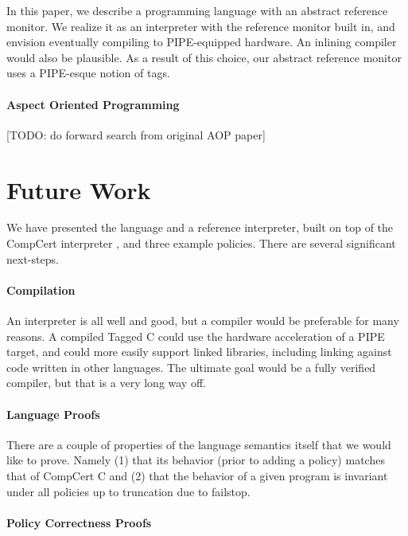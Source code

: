 \documentclass{llncs}
\begin{document}
{In this paper, we describe a programming language with an abstract reference monitor.
We realize it as an interpreter with the reference monitor built in, and envision
eventually compiling to PIPE-equipped hardware. An inlining compiler would also be plausible.
As a result of this choice, our abstract reference monitor uses a PIPE-esque notion of
tags.

\paragraph{Aspect Oriented Programming}

[TODO: do forward search from original AOP paper]

\section{Future Work}
\label{sec:futurework}

We have presented the language and a reference interpreter, built on top of the CompCert interpreter
\cite{Leroy09:CompCert}, and three example policies. There are several significant next-steps.

\paragraph{Compilation}

An interpreter is all well and good, but a compiler would be preferable for many reasons.
A compiled Tagged C could use the hardware acceleration of a PIPE target, and could more easily
support linked libraries, including linking against code written in other languages.
The ultimate goal would be a fully verified compiler, but that is a very long way off.


\paragraph{Language Proofs}

There are a couple of properties of the language semantics itself that we would like to prove.
Namely (1) that its behavior (prior to adding a policy) matches that of CompCert C and
(2) that the behavior of a given program is invariant under all policies up to truncation due
to failstop.

\paragraph{Policy Correctness Proofs}

}
\end{document}
